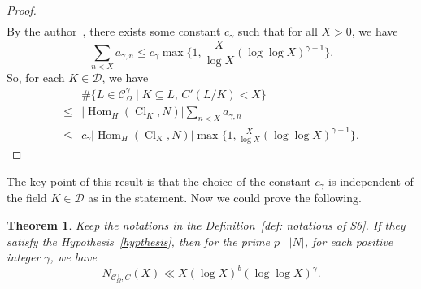 \documentclass[12pt,a4paper]{amsart}
\numberwithin{equation}{section}%
\theoremstyle{plain}%
\newtheorem{theorem}{Theorem}[section]%
\theoremstyle{definition}%
\theoremstyle{remark}%
\begin{document}
\begin{proof}
\begin{align*}
    	\end{align*}
    	By the author~\cite[the Lemma 5.1 and 5.2]{wang2026invariant}, there exists some constant $c_{\gamma}$ such that for all $X>0$, we have
    	\begin{equation*}
    		\sum_{n<X}a_{\gamma,n}\leq c_{\gamma}\max\{1,\frac{X}{\log X}(\log\log X)^{\gamma-1}\}.
    	\end{equation*}
    	So, for each $K\in\mathcal{D}$, we have
    	\begin{align*}
    		& \#\{L\in\mathcal{C}_{\Omega}^{\gamma}\mid K\subseteq L,\, C'(L/K)<X\} \\
    		\leq & \lvert\operatorname{Hom}_{H}(\operatorname{Cl}_{K},N)\rvert\sum_{n<X}a_{\gamma,n} \\
    		\leq & c_{\gamma}\lvert\operatorname{Hom}_{H}(\operatorname{Cl}_{K},N)\rvert\max\{1,\frac{X}{\log X}(\log\log X)^{\gamma-1}\}.
    	\end{align*}
    \end{proof}
    The key point of this result is that the choice of the constant $c_{\gamma}$ is independent of the field $K\in\mathcal{D}$ as in the statement.
    Now we could prove the following.
    \begin{theorem}\label{thm: upper bound estimate S6}
    	Keep the notations in the Definition~\ref{def: notations of S6}.
    	If they satisfy the Hypothesis~\ref{hypthesis}, then for the prime $p\mid\lvert N\rvert$, for each positive integer $\gamma$, we have
    	\begin{equation*}
    		N_{\mathcal{C}_{\Omega}^{\gamma},C}(X)\ll X(\log X)^{b}(\log\log X)^{\gamma}.
    	\end{equation*}
    \end{theorem}
\end{document}
